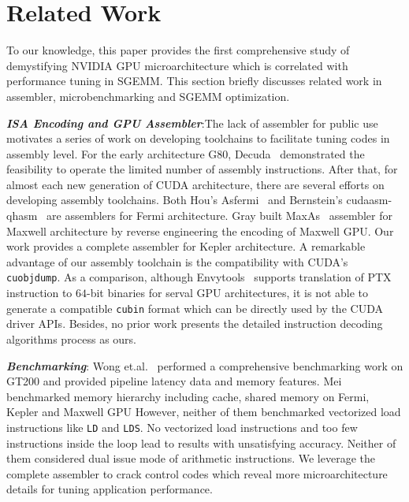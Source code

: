 \section{Related Work}
\label{sec:related}
To our knowledge, this paper provides the first comprehensive study of demystifying NVIDIA GPU microarchitecture which 
is correlated with performance tuning in SGEMM. This section briefly discusses related work in assembler, 
microbenchmarking and SGEMM optimization.

{\em {\bf ISA Encoding and GPU Assembler}}:The lack of assembler for public use motivates a series of work on developing toolchains to facilitate tuning codes in 
assembly level. For the early architecture G80, Decuda~\cite{decuda} demonstrated the feasibility to operate the 
limited number of assembly instructions. After that, for almost each new generation of CUDA architecture, there are several 
efforts on developing assembly toolchains. Both Hou's Asfermi~\cite{asfermi} and Bernstein's 
cudaasm-qhasm~\cite{bernstein2012usable} are assemblers for Fermi architecture. Gray built MaxAs~\cite{maxas} assembler 
for Maxwell architecture by reverse engineering the encoding of Maxwell GPU. Our work provides a complete assembler for 
Kepler architecture. A remarkable advantage of our assembly toolchain is the compatibility with CUDA's {\tt cuobjdump}. 
As a comparison, although Envytools~\cite{envytools} supports translation of PTX instruction to $64$-bit binaries 
for serval GPU architectures, it is not able to generate a compatible {\tt cubin} format which can be directly used by 
the CUDA driver APIs. Besides, no prior work presents the detailed instruction decoding algorithms process as ours.

{\em {\bf Benchmarking}}: Wong et.al.~\cite{wong} performed a 
comprehensive benchmarking work on GT200 and provided pipeline latency data and
memory features. Mei~\cite{mei} benchmarked memory hierarchy including cache, shared memory on Fermi, Kepler and Maxwell GPU
However, neither of them benchmarked 
vectorized load instructions like {\tt LD} and {\tt LDS}. 
No vectorized load instructions and too few instructions inside the loop lead to results with unsatisfying accuracy.
Neither of them considered dual issue mode of 
arithmetic instructions. We leverage the complete assembler to crack control codes which reveal more 
microarchitecture details for tuning application performance.

